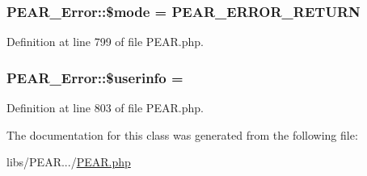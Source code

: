 \subsubsection[{\texorpdfstring{\$mode}{$mode}}]{\setlength{\rightskip}{0pt plus 5cm}P\+E\+A\+R\+\_\+\+Error\+::\$mode = {\bf P\+E\+A\+R\+\_\+\+E\+R\+R\+O\+R\+\_\+\+R\+E\+T\+U\+RN}}\hypertarget{classPEAR__Error_a37fd8f51c6a1a0df165b7e36c88fbea7}{}\label{classPEAR__Error_a37fd8f51c6a1a0df165b7e36c88fbea7}


Definition at line 799 of file P\+E\+A\+R.\+php.

\subsubsection[{\texorpdfstring{\$userinfo}{$userinfo}}]{\setlength{\rightskip}{0pt plus 5cm}P\+E\+A\+R\+\_\+\+Error\+::\$userinfo = \textquotesingle{}\textquotesingle{}}\hypertarget{classPEAR__Error_ad201e08b4f3faace7a729ccf2744fdee}{}\label{classPEAR__Error_ad201e08b4f3faace7a729ccf2744fdee}


Definition at line 803 of file P\+E\+A\+R.\+php.



The documentation for this class was generated from the following file\+:\begin{DoxyCompactItemize}
\item 
libs/\+P\+E\+A\+R.../\hyperlink{PEAR_8php}{P\+E\+A\+R.\+php}\end{DoxyCompactItemize}
